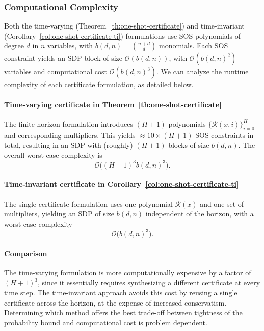 \documentclass[journal,twoside,web]{ieeecolor}
\newcommand{\ml}[1]{{\color{blue}[ML: #1]}}
\newcommand{\RM}[1]{{\color{purple}[RM: #1]}}
\newcommand{\RA}{\mathcal{R}}
\theoremstyle{definition}
\theoremstyle{plain}
\theoremstyle{plain}
\begin{document}
\subsubsection{Computational Complexity}
Both the time-varying (Theorem~\ref{th:one-shot-certificate}) and time-invariant (Corollary~\ref{col:one-shot-certificate-ti}) formulations use SOS polynomials of degree $d$ in $n$ variables, with $b(d,n)=\binom{n+d}{d}$ monomials. Each SOS constraint yields an SDP block of size $\mathcal{O}(b(d,n))$, with $\mathcal{O}(b(d,n)^2)$ variables and computational cost $\mathcal{O}(b(d,n)^3)$.  We can analyze the runtime complexity of each certificate formulation, as detailed below.


\paragraph{Time-varying certificate in Theorem~\ref{th:one-shot-certificate}}
The finite-horizon formulation introduces $(H{+}1)$ polynomials $\{\RA(x,i)\}_{i=0}^H$ and corresponding multipliers.
This yields $\approx 10 \times (H{+}1)$ SOS constraints in total,
resulting in an SDP with (roughly) $(H{+}1)$ blocks of size $b(d,n)$. The overall worst-case complexity is 
$$\mathcal{O}\!\big((H{+}1)^3 b(d,n)^3\big).$$

\paragraph{Time-invariant certificate in Corollary~\ref{col:one-shot-certificate-ti}}
The single-certificate formulation uses one polynomial $\RA(x)$ and one set of multipliers, yielding an SDP of size $b(d,n)$ independent of the horizon, with a worst-case complexity 
$$\mathcal{O}\!\big(b(d,n)^3\big).$$


\paragraph{Comparison}
% 
The time-varying formulation is more computationally expensive by a factor of $(H{+}1)^3$, 
since it essentially requires synthesizing a different certificate at every time step. The time-invariant approach avoids this cost by reusing a single certificate across the horizon, at the expense of increased conservatism. 
Determining which method offers the best trade-off between tightness of the probability bound and computational cost is problem dependent.  
\end{document}

